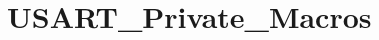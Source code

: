 \hypertarget{group___u_s_a_r_t___private___macros}{}\section{U\+S\+A\+R\+T\+\_\+\+Private\+\_\+\+Macros}
\label{group___u_s_a_r_t___private___macros}
